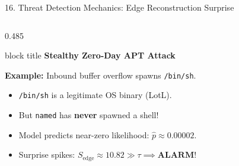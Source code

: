 \documentclass[aspectratio=169,10pt]{beamer}
\begin{document}
\begin{frame}[t]{16. Threat Detection Mechanics: Edge Reconstruction Surprise}
\begin{columns}[T]
\begin{column}{0.485\textwidth}
\begin{beamercolorbox}[rounded=true,shadow=false,sep=0.28em,wd=\linewidth]{block title}
\textbf{\scriptsize Stealthy Zero-Day APT Attack}
\end{beamercolorbox}
\vspace{0.08em}
{\fontsize{6.8pt}{9.2pt}\selectfont
\textbf{Example:} Inbound buffer overflow spawns \texttt{/bin/sh}.\\
\begin{itemize}\itemsep0.15em
  \item \texttt{/bin/sh} is a legitimate OS binary (LotL).
  \item But \texttt{named} has \textbf{never} spawned a shell!
  \item Model predicts near-zero likelihood: $\hat{p} \approx 0.00002$.
  \item Surprise spikes: $S_{\text{edge}} \approx \mathbf{10.82} \gg \tau \implies \mathbf{ALARM!}$
\end{itemize}
}
\end{column}
\end{columns}
\end{frame}
\end{document}
